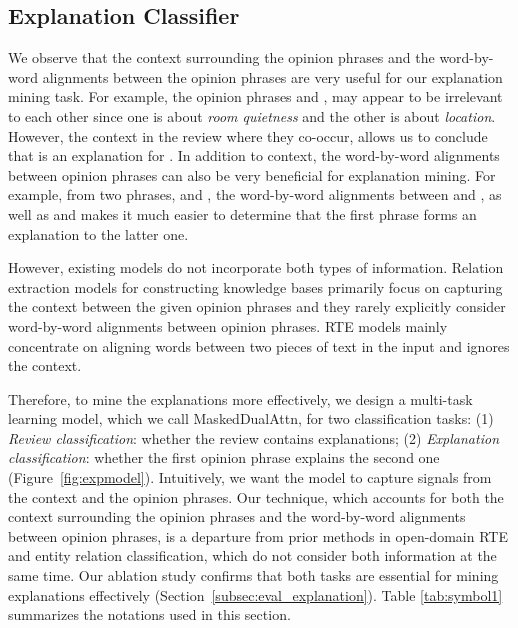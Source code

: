 \subsection{Explanation Classifier}\label{sec:exp:data}
We observe that the context surrounding the opinion phrases and the word-by-word alignments between the opinion phrases are very useful for our explanation mining task. 
For example, the opinion phrases  and , may appear to be irrelevant to each other since one is about \textsl{room quietness} and the other is about \textsl{location}. However,  the context in the review where they co-occur,  allows us to conclude that  is an explanation for . In addition to context, the word-by-word alignments between opinion phrases can also be very beneficial for explanation mining. For example, from two phrases,  and , the word-by-word alignments between  and , as well as  and  makes it much easier to determine that the first phrase forms an explanation to the latter one. 

However, existing models do not incorporate both types of information. Relation extraction models for constructing knowledge bases primarily focus on capturing the context between the given opinion phrases and they rarely explicitly consider word-by-word alignments between opinion phrases. RTE models mainly concentrate on aligning words between two pieces of text in the input and ignores the context. 


Therefore, to mine the explanations more effectively, we design a multi-task learning model, which we call MaskedDualAttn, for two classification tasks: (1) {\em Review classification}: whether the review contains explanations; (2) {\em Explanation classification}: whether the first opinion phrase explains the second one  (Figure~\ref{fig:expmodel}). Intuitively, we want the model to capture signals from the context and the opinion phrases. 
Our technique, which accounts for both the context surrounding the opinion phrases and the word-by-word alignments between opinion phrases, is a departure from prior methods in open-domain RTE and entity relation classification, which do not consider both information at the same time. Our ablation study confirms that both tasks are essential for mining explanations effectively (Section~\ref{subsec:eval_explanation}).
Table \ref{tab:symbol1} summarizes the notations used in this section.


